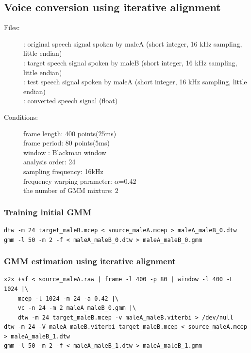 \documentclass[a4paper,10pt]{article}
\begin{document}
\subsection{Voice conversion using iterative alignment}
\begin{description}
 \item[Files:]
   : 
	    original speech signal spoken by maleA (short integer, 16 kHz sampling, little endian) \\
   : 
	    target speech signal spoken by maleB (short integer, 16 kHz sampling, little endian) \\
   : 
	    test speech signal spoken by maleA (short integer, 16 kHz sampling, little endian) \\
   :
	    converted speech signal (float)
 \item[Conditions:]
   frame length: 400 points(25ms) \\
   frame period: 80 points(5ms) \\
   window : Blackman window \\
   analysis order: 24 \\
   sampling frequency: 16kHz \\
   frequency warping parameter: $\alpha$=0.42 \\
   the number of GMM mixture: 2
\end{description} 
\subsubsection{Training initial GMM}
\begin{verbatim}
dtw -m 24 target_maleB.mcep < source_maleA.mcep > maleA_maleB_0.dtw
gmm -l 50 -m 2 -f < maleA_maleB_0.dtw > maleA_maleB_0.gmm
\end{verbatim}
\subsubsection{GMM estimation using iterative alignment}
\begin{verbatim}
x2x +sf < source_maleA.raw | frame -l 400 -p 80 | window -l 400 -L 1024 |\
    mcep -l 1024 -m 24 -a 0.42 |\
    vc -n 24 -m 2 maleA_maleB_0.gmm |\
    dtw -m 24 target_maleB.mcep -v maleA_maleB.viterbi > /dev/null
dtw -m 24 -V maleA_maleB.viterbi target_maleB.mcep < source_maleA.mcep > maleA_maleB_1.dtw
gmm -l 50 -m 2 -f < maleA_maleB_1.dtw > maleA_maleB_1.gmm
\end{verbatim}
\end{document}
